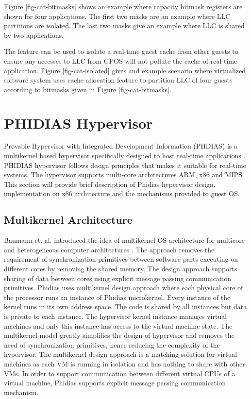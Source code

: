 
Figure \ref{fig-cat-bitmasks} shows an example where capacity bitmask registers are shown for four applications. The first two masks are 
an example where LLC partitions are isolated. The last two masks give an example where LLC is shared by two applications.

The feature can be used to isolate a real-time guest cache from other guests to ensure any accesses to LLC from GPOS
will not pollute the cache of real-time application. Figure \ref{fig-cat-isolated} gives and example scenario where virtualized software system
uses cache allocation feature to partition LLC of four guests according to bitmasks given in Figure \ref{fig-cat-bitmasks}.




\section{PHIDIAS Hypervisor}
Provable Hypervisor with Integrated Development Information (PHDIAS) is a multikernel based hypervisor specifically designed to host real-time applications \cite{nordholz2017design}. 
PHIDIAS hypervisor follows design principles that makes it suitable for real-time systems. 
The hypervisor supports multi-core architectures ARM, x86 and MIPS. This section will provide brief description of Phidias hypervisor design, 
implementation on x86 architecture and the mechanisms provided to guest OS.

\subsection{Multikernel Architecture}
Baumann et. al. introduced the idea of multikernel OS architecture for multicore and heterogeneous computer architectures \cite{baumann2009multikernel}. 
The approach removes the requirement of synchronization primitives between software parts executing on different cores by removing the shared memory.
The design approach supports sharing of data between cores using explicit message passing communication primitives.
Phidias uses multikernel design approach where each physical core of the processor runs an instance of Phidias microkernel.
Every instance of the kernel runs in its own address space. The code is shared by all instances but data is private to each instance. 
The hypervisor kernel instance manages virtual machines and only this instance has access to the virtual machine state.
The multikernel model greatly simplifies the design of hypervisor and removes the need of synchronization primitives, 
hence reducing the complexity of the hypervisor.
The multikernel design approach is a matching solution for virtual machines as each VM is running in isolation and 
has nothing to share with other VMs.
In order to support communication between different virtual CPUs of a virtual machine, Phidias supports 
explicit message passing communication mechanism.

